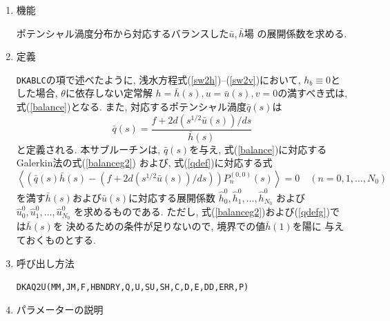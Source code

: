 \documentclass[a4j,fleqn]{jarticle}
\begin{document}
\begin{enumerate}

\item 機能

ポテンシャル渦度分布から対応するバランスした$\bar u,\bar h$場
の展開係数を求める.

\item 定義

{\tt DKABLC}の項で述べたように, 
浅水方程式(\ref{sw2h})--(\ref{sw2v})において,
$h_b\equiv 0$とした場合, $\theta$に依存しない定常解
$h=\bar h(s), u=\bar u(s), v=0$の満すべき式は,
式(\ref{balance})となる. 
また, 対応するポテンシャル渦度$\bar q(s)$は
\begin{equation}
\bar q(s)=\frac{f+2d(s^{1/2}\bar u(s))/ds}{\bar h(s)}
\label{qdef}   
\end{equation}
と定義される. 本サブルーチンは, $\bar q(s)$を与え,
式(\ref{balance})に対応するGalerkin法の式(\ref{balanceg2})
および, 式(\ref{qdef})に対応する式
\begin{equation}
\left\langle\left(\bar q(s)\bar h(s)-(f+2d(s^{1/2}\bar u(s))/ds)
\right)
P^{(0,0)}_n(s)\right\rangle
=0\quad (n=0,1,\dots,N_0)
\label{qdefg}   
\end{equation}
を満す$\bar h(s)$および$\bar u(s)$に対応する展開係数
$\hat h^0_0,\hat h^0_1,\dots,\hat h^0_{N_0}$
および$\hat u^0_0,\hat u^0_1,\dots,\hat u^0_{N_0}$
を求めるものである.
ただし, 式(\ref{balanceg2})および(\ref{qdefg})では$\bar h(s)$を
決めるための条件が足りないので, 境界での値$\bar h(1)$を陽に
与えておくものとする.

\item 呼び出し方法 
    
{\tt DKAQ2U(MM,JM,F,HBNDRY,Q,U,SU,SH,C,D,E,DD,ERR,P)}
  
\item パラメーターの説明 
    

\end{enumerate}
\end{document}
